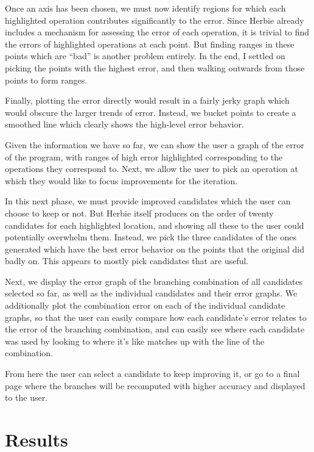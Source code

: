 \documentclass{chi2009}
\begin{document}
Once an axis has been chosen, we must now identify regions for which
each highlighted operation contributes significantly to the
error. Since Herbie already includes a mechanism for assessing the
error of each operation, it is trivial to find the errors of
highlighted operations at each point. But finding ranges in these
points which are ``bad'' is another problem entirely. In the end, I
settled on picking the points with the highest error, and then walking
outwards from those points to form ranges.

Finally, plotting the error directly would result in a fairly jerky
graph which would obscure the larger trends of error. Instead, we
bucket points to create a smoothed line which clearly shows the
high-level error behavior.

Given the information we have so far, we can show the user a graph of
the error of the program, with ranges of high error highlighted
corresponding to the operations they correspond to. Next, we allow the
user to pick an operation at which they would like to focus
improvements for the iteration.

In this next phase, we must provide improved candidates which the user
can choose to keep or not. But Herbie itself produces on the order of
twenty candidates for each highlighted location, and showing all these
to the user could potentially overwhelm them. Instead, we pick the
three candidates of the ones generated which have the best error
behavior on the points that the original did badly on. This appears to
mostly pick candidates that are useful.

Next, we display the error graph of the branching combination of all
candidates selected so far, as well as the individual candidates and
their error graphs. We additionally plot the combination error on each
of the individual candidate graphs, so that the user can easily
compare how each candidate's error relates to the error of the
branching combination, and can easily see where each candidate was
used by looking to where it's like matches up with the line of the
combination.

From here the user can select a candidate to keep improving it, or go
to a final page where the branches will be recomputed with higher
accuracy and displayed to the user.

\section{Results}
\label{sec:results}
\end{document}
